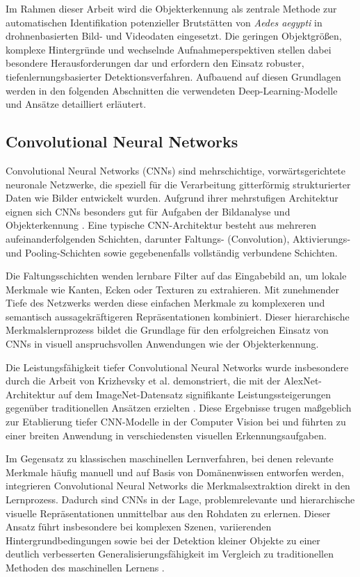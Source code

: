 Im Rahmen dieser Arbeit wird die Objekterkennung als zentrale Methode zur automatischen Identifikation potenzieller Brutstätten von \textit{Aedes aegypti} in drohnenbasierten Bild- und Videodaten eingesetzt. Die geringen Objektgrößen, komplexe Hintergründe und wechselnde Aufnahmeperspektiven stellen dabei besondere Herausforderungen dar und erfordern den Einsatz robuster, tiefenlernungsbasierter Detektionsverfahren. Aufbauend auf diesen Grundlagen werden in den folgenden Abschnitten die verwendeten Deep-Learning-Modelle und Ansätze detailliert erläutert.

\subsection{Convolutional Neural Networks}

Convolutional Neural Networks (CNNs) sind mehrschichtige, vorwärtsgerichtete
neuronale Netzwerke, die speziell für die Verarbeitung gitterförmig strukturierter
Daten wie Bilder entwickelt wurden. Aufgrund ihrer mehrstufigen Architektur eignen
sich CNNs besonders gut für Aufgaben der Bildanalyse und Objekterkennung
\cite{LeCun1998}. Eine typische CNN-Architektur besteht aus mehreren
aufeinanderfolgenden Schichten, darunter Faltungs- (Convolution), Aktivierungs- und
Pooling-Schichten sowie gegebenenfalls vollständig verbundene Schichten.

Die Faltungsschichten wenden lernbare Filter auf das Eingabebild an, um lokale
Merkmale wie Kanten, Ecken oder Texturen zu extrahieren. Mit zunehmender Tiefe des
Netzwerks werden diese einfachen Merkmale zu komplexeren und semantisch
aussagekräftigeren Repräsentationen kombiniert. Dieser hierarchische
Merkmalslernprozess bildet die Grundlage für den erfolgreichen Einsatz von CNNs in
visuell anspruchsvollen Anwendungen wie der Objekterkennung.

Die Leistungsfähigkeit tiefer Convolutional Neural Networks wurde insbesondere durch
die Arbeit von Krizhevsky et al. demonstriert, die mit der AlexNet-Architektur auf dem
ImageNet-Datensatz signifikante Leistungssteigerungen gegenüber traditionellen
Ansätzen erzielten \cite{Krizhevsky2012}. Diese Ergebnisse trugen maßgeblich zur
Etablierung tiefer CNN-Modelle in der Computer Vision bei und führten zu einer breiten
Anwendung in verschiedensten visuellen Erkennungsaufgaben.

Im Gegensatz zu klassischen maschinellen Lernverfahren, bei denen relevante
Merkmale häufig manuell und auf Basis von Domänenwissen entworfen werden,
integrieren Convolutional Neural Networks die Merkmalsextraktion direkt in den
Lernprozess. Dadurch sind CNNs in der Lage, problemrelevante und hierarchische
visuelle Repräsentationen unmittelbar aus den Rohdaten zu erlernen. Dieser Ansatz
führt insbesondere bei komplexen Szenen, variierenden Hintergrundbedingungen
sowie bei der Detektion kleiner Objekte zu einer deutlich verbesserten
Generalisierungsfähigkeit im Vergleich zu traditionellen Methoden des maschinellen
Lernens \cite{LeCun1998,Goodfellow2016}.

